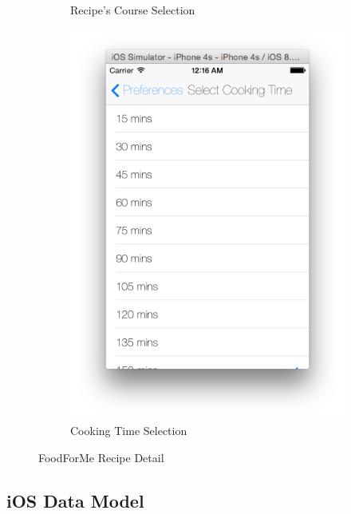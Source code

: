 \begin{figure}[h]
\begin{subfigure}{.32\textwidth}
	  		\caption{Recipe's Course Selection}
	  	\end{subfigure}
	  	\begin{subfigure}{.32\textwidth}
	  		\includegraphics[width=.75\linewidth]{figures/ch4_app_screen_shots/preferences/peferences_cooking_time.png}
	  		\caption{Cooking Time Selection}
	  	\end{subfigure}
	  	\caption{FoodForMe Recipe Detail}
	  	\label{fig:foodforme_preferences}
	  \end{figure}
	  
\newpage
\subsection{iOS Data Model}	  


